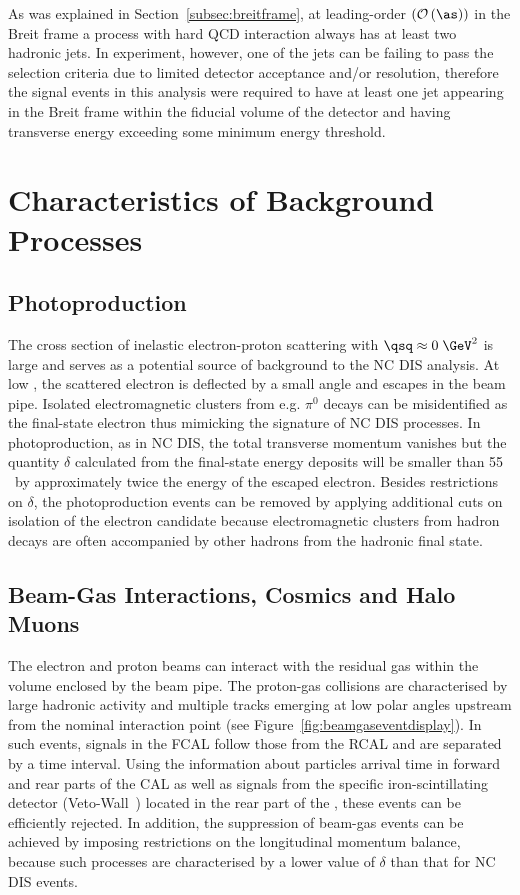 As was explained in Section~\ref{subsec:breitframe}, at leading-order $\left(\mathcal{O}\left(\as\right)\right)$ in the Breit frame a process with hard QCD interaction always has at least two hadronic jets. In experiment, however, one of the jets can be failing to pass the selection criteria due to limited detector acceptance and/or resolution, therefore the signal events in this analysis were required to have at least one jet appearing in the Breit frame within the fiducial volume of the detector and having transverse energy exceeding some minimum energy threshold.

\section{Characteristics of Background Processes}
\label{sec:bgchar}

\subsection{Photoproduction}
\label{subsec:photoprodbg}
The cross section of inelastic electron-proton scattering with $\qsq \approx 0\;\GeV^2$ is large and serves as a potential source of background to the NC DIS analysis. At low \qsq, the scattered electron is deflected by a small angle and escapes in the beam pipe. Isolated electromagnetic clusters from e.g. $\pi^0$ decays can be misidentified as the final-state electron thus mimicking the signature of NC DIS processes. In photoproduction, as in NC DIS, the total transverse momentum vanishes but the quantity $\delta$ calculated from the final-state energy deposits will be smaller than 55 \GeV~by approximately twice the energy of the escaped electron.
Besides restrictions on $\delta$, the photoproduction events can be removed by applying additional cuts on isolation of the electron candidate because electromagnetic clusters from hadron decays are often accompanied by other hadrons from the hadronic final state.

\subsection{Beam-Gas Interactions, Cosmics and Halo Muons}
\label{subsec:beamgasfeatures}
The electron and proton beams can interact with the residual gas within the volume enclosed by the beam pipe. The proton-gas collisions are characterised by large hadronic activity and multiple tracks emerging at low polar angles upstream from the nominal interaction point (see Figure~\ref{fig:beamgaseventdisplay}). In such events, signals in the FCAL follow those from the RCAL and are separated by a time interval. Using the information about particles arrival time in forward and rear parts of the CAL as well as signals from the specific iron-scintillating detector (Veto-Wall~\cite{zeus:1993:bluebook}) located in the rear part of the \zeus, these events can be efficiently rejected. In addition, the suppression of beam-gas events can be achieved by imposing restrictions on the longitudinal momentum balance, because such processes are characterised by a lower value of $\delta$ than that for NC DIS events. 

